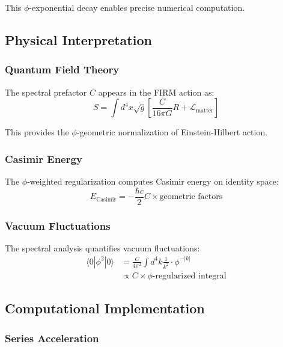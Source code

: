 This $\phi$-exponential decay enables precise numerical computation.

\subsection{Physical Interpretation}

\subsubsection{Quantum Field Theory}

The spectral prefactor $C$ appears in the FIRM action as:
\begin{equation}
S = \int d^4x \sqrt{g} \left[ \frac{C}{16\pi G} R + \mathcal{L}_{\text{matter}} \right]
\end{equation}

This provides the $\phi$-geometric normalization of Einstein-Hilbert action.

\subsubsection{Casimir Energy}

The $\phi$-weighted regularization computes Casimir energy on identity space:
\begin{equation}
E_{\text{Casimir}} = -\frac{\hbar c}{2} C \times \text{geometric factors}
\end{equation}

\subsubsection{Vacuum Fluctuations}

The spectral analysis quantifies vacuum fluctuations:
\begin{align}
\langle 0| \phi^2 |0 \rangle &= \frac{C}{4\pi^2} \int d^4k \frac{1}{k^2} \cdot \phi^{-|k|}\\
&\propto C \times \text{$\phi$-regularized integral}
\end{align}

\subsection{Computational Implementation}

\subsubsection{Series Acceleration}

